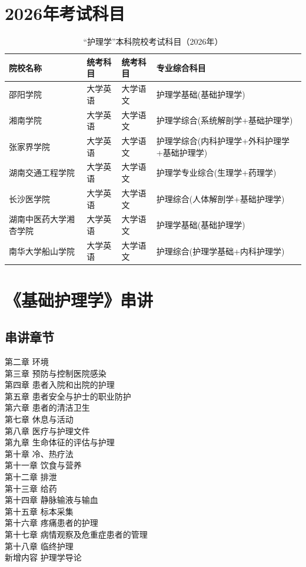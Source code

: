 \documentclass[11pt, a4paper]{ctexart}
\begin{document}
\section{2026年考试科目}
\begin{table}[htbp]
	\centering
	\caption{“护理学”本科院校考试科目（2026年）}
	\label{tab:exam}
	\small
	\begin{tabular}{|l|l|l|l|}
		\hline
		\textbf{院校名称} & \textbf{统考科目} & \textbf{统考科目} & \textbf{专业综合科目}          \\
		\hline
		邵阳学院          & 大学英语          & 大学语文          & 护理学基础(基础护理学)             \\
		湘南学院          & 大学英语          & 大学语文          & 护理学综合(系统解剖学+基础护理学)       \\
		张家界学院         & 大学英语          & 大学语文          & 护理学综合(内科护理学+外科护理学+基础护理学) \\
		湖南交通工程学院      & 大学英语          & 大学语文          & 护理学专业综合(生理学+药理学)         \\
		长沙医学院         & 大学英语          & 大学语文          & 护理综合(人体解剖学+基础护理学)        \\
		湖南中医药大学湘杏学院   & 大学英语          & 大学语文          & 护理学基础(基础护理学)             \\
		南华大学船山学院      & 大学英语          & 大学语文          & 护理综合(护理学基础+内科护理学)        \\
		\hline
	\end{tabular}
\end{table}

\section{《基础护理学》串讲}
\subsection{串讲章节}
第二章 环境 \\
第三章 预防与控制医院感染 \\
第四章 患者入院和出院的护理 \\
第五章 患者安全与护士的职业防护 \\
第六章 患者的清洁卫生 \\
第七章 休息与活动 \\
第八章 医疗与护理文件 \\
第九章 生命体征的评估与护理 \\
第十章 冷、热疗法 \\
第十一章 饮食与营养 \\
第十二章 排泄 \\
第十三章 给药 \\
第十四章 静脉输液与输血 \\
第十五章 标本采集 \\
第十六章 疼痛患者的护理 \\
第十七章 病情观察及危重症患者的管理 \\
第十八章 临终护理 \\
新增内容 护理学导论
\end{document}
